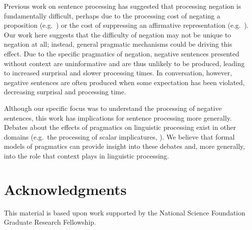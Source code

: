 \documentclass[man]{apa2}
\begin{document}
Previous work on sentence processing has suggested that processing negation is fundamentally difficult, perhaps due to the processing cost of negating a proposition (e.g.\ ) or the cost of suppressing an affirmative representation (e.g.\ ).  Our work here suggests that the difficulty of negation may not be unique to negation at all; instead, general pragmatic mechanisms could be driving this effect.  Due to the specific pragmatics of negation, negative sentences presented without context are uninformative and are thus unlikely to be produced, leading to increased surprisal and slower processing times.  In conversation, however, negative sentences are often produced when some expectation has been violated, decreasing surprisal and processing time.  

Although our specific focus was to understand the processing of negative sentences, this work has implications for sentence processing more generally.  Debates about the effects of pragmatics on linguistic processing exist in other domains (e.g.\ the processing of scalar implicatures, ). We believe that formal models of pragmatics can provide insight into these debates and, more generally, into the role that context plays in linguistic processing. 

\section{Acknowledgments}
This material is based upon work supported by the National Science Foundation Graduate Research Fellowship. 




\setlength{\bibleftmargin}{.125in}
\setlength{\bibindent}{-\bibleftmargin}


\end{document}
